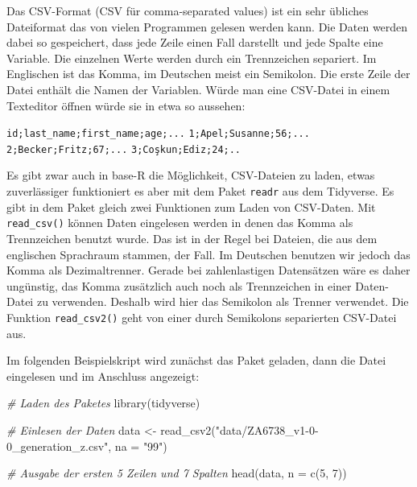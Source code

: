 \documentclass[
]{book}
\newenvironment{Shaded}{\begin{snugshade}}{\end{snugshade}}
\newcommand{\AttributeTok}[1]{\textcolor[rgb]{0.77,0.63,0.00}{#1}}
\newcommand{\CommentTok}[1]{\textcolor[rgb]{0.56,0.35,0.01}{\textit{#1}}}
\newcommand{\DecValTok}[1]{\textcolor[rgb]{0.00,0.00,0.81}{#1}}
\newcommand{\FunctionTok}[1]{\textcolor[rgb]{0.00,0.00,0.00}{#1}}
\newcommand{\NormalTok}[1]{#1}
\newcommand{\OtherTok}[1]{\textcolor[rgb]{0.56,0.35,0.01}{#1}}
\newcommand{\StringTok}[1]{\textcolor[rgb]{0.31,0.60,0.02}{#1}}
\begin{document}
Das CSV-Format (CSV für comma-separated values) ist ein sehr übliches Dateiformat das von vielen Programmen gelesen werden kann. Die Daten werden dabei so gespeichert, dass jede Zeile einen Fall darstellt und jede Spalte eine Variable. Die einzelnen Werte werden durch ein Trennzeichen separiert. Im Englischen ist das Komma, im Deutschen meist ein Semikolon. Die erste Zeile der Datei enthält die Namen der Variablen. Würde man eine CSV-Datei in einem Texteditor öffnen würde sie in etwa so aussehen:

\texttt{id;last\_name;first\_name;age;...}
\texttt{1;Apel;Susanne;56;...}
\texttt{2;Becker;Fritz;67;...}
\texttt{3;Coşkun;Ediz;24;..}

Es gibt zwar auch in base-R die Möglichkeit, CSV-Dateien zu laden, etwas zuverlässiger funktioniert es aber mit dem Paket \texttt{readr} aus dem Tidyverse. Es gibt in dem Paket gleich zwei Funktionen zum Laden von CSV-Daten. Mit \texttt{read\_csv()} können Daten eingelesen werden in denen das Komma als Trennzeichen benutzt wurde. Das ist in der Regel bei Dateien, die aus dem englischen Sprachraum stammen, der Fall. Im Deutschen benutzen wir jedoch das Komma als Dezimaltrenner. Gerade bei zahlenlastigen Datensätzen wäre es daher ungünstig, das Komma zusätzlich auch noch als Trennzeichen in einer Daten-Datei zu verwenden. Deshalb wird hier das Semikolon als Trenner verwendet. Die Funktion \texttt{read\_csv2()} geht von einer durch Semikolons separierten CSV-Datei aus.

Im folgenden Beispielskript wird zunächst das Paket geladen, dann die Datei eingelesen und im Anschluss angezeigt:

\begin{Shaded}
\begin{Highlighting}[]
\CommentTok{\# Laden des Paketes}
\FunctionTok{library}\NormalTok{(tidyverse)}

\CommentTok{\# Einlesen der Daten}
\NormalTok{data }\OtherTok{\textless{}{-}} \FunctionTok{read\_csv2}\NormalTok{(}\StringTok{"data/ZA6738\_v1{-}0{-}0\_generation\_z.csv"}\NormalTok{, }\AttributeTok{na =} \StringTok{"99"}\NormalTok{)}
\end{Highlighting}
\end{Shaded}

\begin{Shaded}
\begin{Highlighting}[]
\CommentTok{\# Ausgabe der ersten 5 Zeilen und 7 Spalten}
\FunctionTok{head}\NormalTok{(data, }\AttributeTok{n =} \FunctionTok{c}\NormalTok{(}\DecValTok{5}\NormalTok{, }\DecValTok{7}\NormalTok{))}
\end{Highlighting}
\end{Shaded}
\end{document}
